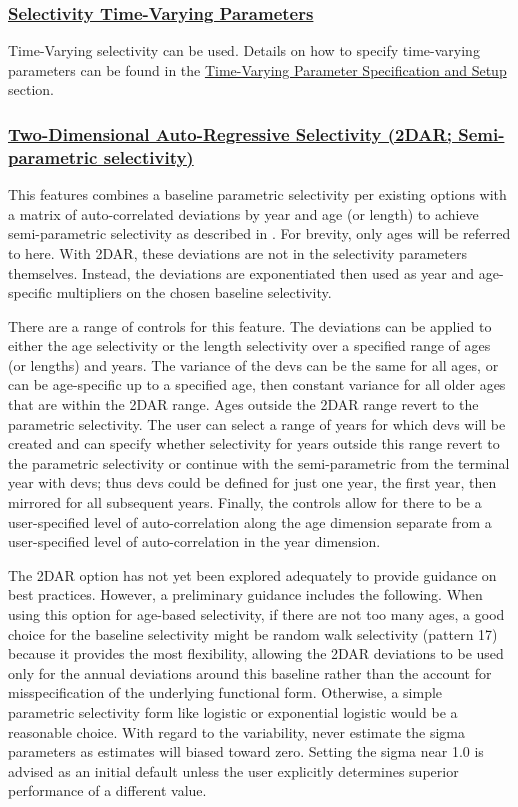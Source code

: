 \hypertarget{Selex-TV}{}
\subsubsection[Selectivity Time-Varying Parameters]{\protect\hyperlink{Selex-TV}{Selectivity Time-Varying Parameters}}
Time-Varying selectivity can be used. Details on how to specify time-varying parameters can be found in the \hyperlink{tvOrder}{Time-Varying Parameter Specification and Setup} section.

\hypertarget{TwoDAR}{}
\subsubsection[Two-Dimensional Auto-Regressive Selectivity (2DAR; Semi-parametric selectivity)]{\protect\hyperlink{TwoDAR}{Two-Dimensional Auto-Regressive Selectivity (2DAR; Semi-parametric selectivity)}}
This features combines a baseline parametric selectivity per existing options with a matrix of auto-correlated deviations by year and age (or length) to achieve semi-parametric selectivity as described in \citet{xu-new-2019}. For brevity, only ages will be referred to here. With 2DAR, these deviations are not in the selectivity parameters themselves. Instead, the deviations are exponentiated then used as year and age-specific multipliers on the chosen baseline selectivity.

There are a range of controls for this feature. The deviations can be applied to either the age selectivity or the length selectivity over a specified range of ages (or lengths) and years. The variance of the devs can be the same for all ages, or can be age-specific up to a specified age, then constant variance for all older ages that are within the 2DAR range. Ages outside the 2DAR range revert to the parametric selectivity. The user can select a range of years for which devs will be created and can specify whether selectivity for years outside this range revert to the parametric selectivity or continue with the semi-parametric from the terminal year with devs; thus devs could be defined for just one year, the first year, then mirrored for all subsequent years. Finally, the controls allow for there to be a user-specified level of auto-correlation along the age dimension separate from a user-specified level of auto-correlation in the year dimension.

The 2DAR option has not yet been explored adequately to provide guidance on best practices. However, a preliminary guidance includes the following. When using this option for age-based selectivity, if there are not too many ages, a good choice for the baseline selectivity might be random walk selectivity (pattern 17) because it provides the most flexibility, allowing the 2DAR deviations to be used only for the annual deviations around this baseline rather than the account for misspecification of the underlying functional form. Otherwise, a simple parametric selectivity form like logistic or exponential logistic would be a reasonable choice. With regard to the variability, never estimate the sigma parameters as estimates will biased toward zero. Setting the sigma near 1.0 is advised as an initial default unless the user explicitly determines superior performance of a different value.

